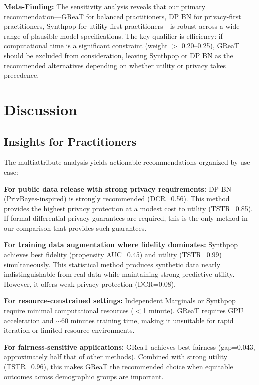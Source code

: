\documentclass[12pt,a4paper]{article}
\begin{document}
\textbf{Meta-Finding:} The sensitivity analysis reveals that our primary recommendation---GReaT for balanced practitioners, DP BN for privacy-first practitioners, Synthpop for utility-first practitioners---is robust across a wide range of plausible model specifications. The key qualifier is efficiency: if computational time is a significant constraint (weight $>$ 0.20--0.25), GReaT should be excluded from consideration, leaving Synthpop or DP BN as the recommended alternatives depending on whether utility or privacy takes precedence.

\section{Discussion}

\subsection{Insights for Practitioners}

The multiattribute analysis yields actionable recommendations organized by use case:

\textbf{For public data release with strong privacy requirements:} DP BN (PrivBayes-inspired) is strongly recommended (DCR=0.56). This method provides the highest privacy protection at a modest cost to utility (TSTR=0.85). If formal differential privacy guarantees are required, this is the only method in our comparison that provides such guarantees.

\textbf{For training data augmentation where fidelity dominates:} Synthpop achieves best fidelity (propensity AUC=0.45) and utility (TSTR=0.99) simultaneously. This statistical method produces synthetic data nearly indistinguishable from real data while maintaining strong predictive utility. However, it offers weak privacy protection (DCR=0.08).

\textbf{For resource-constrained settings:} Independent Marginals or Synthpop require minimal computational resources ($<$1 minute). GReaT requires GPU acceleration and $\sim$60 minutes training time, making it unsuitable for rapid iteration or limited-resource environments.

\textbf{For fairness-sensitive applications:} GReaT achieves best fairness (gap=0.043, approximately half that of other methods). Combined with strong utility (TSTR=0.96), this makes GReaT the recommended choice when equitable outcomes across demographic groups are important.
\end{document}
